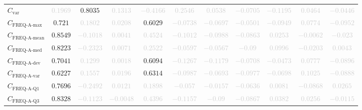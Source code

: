\documentclass{standalone}
\newcommand{\varietyname}{\text{var}}
\newcommand{\variety}{C_{\varietyname}}
\newcommand{\actfreqmaxname}{\text{FREQ-A-max}}
\newcommand{\actfreqmax}{C_{\actfreqmaxname}}
\newcommand{\actfreqmeanname}{\text{FREQ-A-mean}}
\newcommand{\actfreqmean}{C_{\actfreqmeanname}}
\newcommand{\actfreqmedianname}{\text{FREQ-A-med}}
\newcommand{\actfreqmedian}{C_{\actfreqmedianname}}
\newcommand{\actfreqdevname}{\text{FREQ-A-dev}}
\newcommand{\actfreqdev}{C_{\actfreqdevname}}
\newcommand{\actfreqvarname}{\text{FREQ-A-var}}
\newcommand{\actfreqvar}{C_{\actfreqvarname}}
\newcommand{\actfreqqonename}{\text{FREQ-A-Q1}}
\newcommand{\actfreqqone}{C_{\actfreqqonename}}
\newcommand{\actfreqqthreename}{\text{FREQ-A-Q3}}
\newcommand{\actfreqqthree}{C_{\actfreqqthreename}}
\begin{document}
\begin{tabular}{lcccccccccc}
$\variety$ & \textcolor{lightgray}{$0.1969$} & $0.8035$ & \textcolor{lightgray}{$0.1313$} & \textcolor{lightgray}{$-0.4166$} & \textcolor{lightgray}{$0.2546$} & \textcolor{lightgray}{$0.0538$} & \textcolor{lightgray}{$-0.0705$} & \textcolor{lightgray}{$-0.1195$} & \textcolor{lightgray}{$0.0464$} & \textcolor{lightgray}{$-0.0446$} \\ 
$\actfreqmax$ & $0.721$ & \textcolor{lightgray}{$0.1802$} & \textcolor{lightgray}{$0.0208$} & $0.6029$ & \textcolor{lightgray}{$-0.0738$} & \textcolor{lightgray}{$-0.0697$} & \textcolor{lightgray}{$-0.0501$} & \textcolor{lightgray}{$-0.0949$} & \textcolor{lightgray}{$0.0774$} & \textcolor{lightgray}{$-0.0952$} \\ 
$\actfreqmean$ & $0.8549$ & \textcolor{lightgray}{$-0.1018$} & \textcolor{lightgray}{$0.0041$} & \textcolor{lightgray}{$0.4524$} & \textcolor{lightgray}{$-0.1012$} & \textcolor{lightgray}{$-0.0988$} & \textcolor{lightgray}{$-0.0863$} & \textcolor{lightgray}{$0.0253$} & \textcolor{lightgray}{$-0.0062$} & \textcolor{lightgray}{$-0.023$} \\ 
$\actfreqmedian$ & $0.8223$ & \textcolor{lightgray}{$-0.2323$} & \textcolor{lightgray}{$0.0071$} & \textcolor{lightgray}{$0.2522$} & \textcolor{lightgray}{$-0.0597$} & \textcolor{lightgray}{$-0.0567$} & \textcolor{lightgray}{$-0.09$} & \textcolor{lightgray}{$0.0996$} & \textcolor{lightgray}{$-0.0203$} & \textcolor{lightgray}{$0.0043$} \\ 
$\actfreqdev$ & $0.7041$ & \textcolor{lightgray}{$0.1299$} & \textcolor{lightgray}{$0.0018$} & $0.6094$ & \textcolor{lightgray}{$-0.1267$} & \textcolor{lightgray}{$-0.1179$} & \textcolor{lightgray}{$-0.0708$} & \textcolor{lightgray}{$-0.0473$} & \textcolor{lightgray}{$0.0777$} & \textcolor{lightgray}{$-0.0896$} \\ 
$\actfreqvar$ & $0.6227$ & \textcolor{lightgray}{$0.1557$} & \textcolor{lightgray}{$0.0196$} & $0.6314$ & \textcolor{lightgray}{$-0.0987$} & \textcolor{lightgray}{$-0.0693$} & \textcolor{lightgray}{$-0.0977$} & \textcolor{lightgray}{$-0.0698$} & \textcolor{lightgray}{$0.1025$} & \textcolor{lightgray}{$-0.0888$} \\ 
$\actfreqqone$ & $0.7696$ & \textcolor{lightgray}{$-0.2492$} & \textcolor{lightgray}{$0.0121$} & \textcolor{lightgray}{$0.1898$} & \textcolor{lightgray}{$-0.057$} & \textcolor{lightgray}{$-0.0157$} & \textcolor{lightgray}{$-0.0636$} & \textcolor{lightgray}{$0.0081$} & \textcolor{lightgray}{$-0.0868$} & \textcolor{lightgray}{$0.0265$} \\ 
$\actfreqqthree$ & $0.8328$ & \textcolor{lightgray}{$-0.1123$} & \textcolor{lightgray}{$-0.0048$} & \textcolor{lightgray}{$0.4396$} & \textcolor{lightgray}{$-0.1157$} & \textcolor{lightgray}{$-0.09$} & \textcolor{lightgray}{$-0.0867$} & \textcolor{lightgray}{$0.0382$} & \textcolor{lightgray}{$0.0256$} & \textcolor{lightgray}{$-0.0115$} \\ 

\end{tabular}
\end{document}
